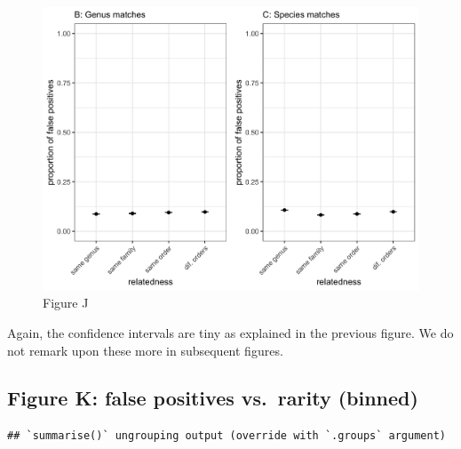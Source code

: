 \documentclass[
]{article}
\newenvironment{Shaded}{\begin{snugshade}}{\end{snugshade}}
\newcommand{\CommentTok}[1]{\textcolor[rgb]{0.56,0.35,0.01}{\textit{#1}}}
\newcommand{\DataTypeTok}[1]{\textcolor[rgb]{0.13,0.29,0.53}{#1}}
\newcommand{\KeywordTok}[1]{\textcolor[rgb]{0.13,0.29,0.53}{\textbf{#1}}}
\newcommand{\NormalTok}[1]{#1}
\newcommand{\OperatorTok}[1]{\textcolor[rgb]{0.81,0.36,0.00}{\textbf{#1}}}
\newcommand{\StringTok}[1]{\textcolor[rgb]{0.31,0.60,0.02}{#1}}
\begin{document}
\begin{figure}
\centering
\includegraphics{figJ_combined.jpg}
\caption{Figure J}
\end{figure}

Again, the confidence intervals are tiny as explained in the previous
figure. We do not remark upon these more in subsequent figures.

\hypertarget{figure-k-false-positives-vs.-rarity-binned}{%
\subsection{Figure K: false positives vs.~rarity
(binned)}\label{figure-k-false-positives-vs.-rarity-binned}}

\begin{Shaded}
\end{Shaded}

\begin{verbatim}
## `summarise()` ungrouping output (override with `.groups` argument)
\end{verbatim}
\end{document}
